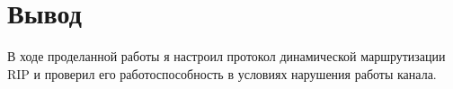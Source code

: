 \chapter{Вывод}
В ходе проделанной работы я настроил протокол динамической маршрутизации RIP и проверил его работоспособность в условиях нарушения работы канала.
\endinput